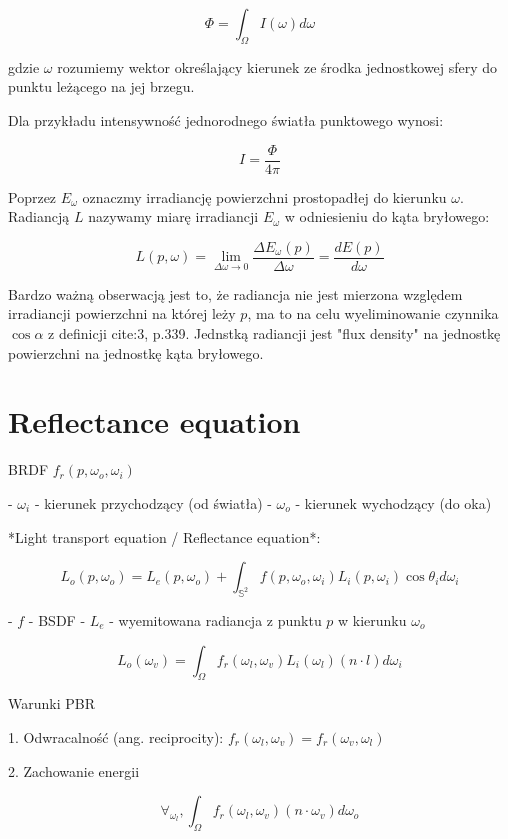 \documentclass[../main.tex]{subfiles}
\begin{document}
$$
\Phi = \int_{\Omega} {I(\omega) d\omega}
$$

gdzie $\omega$ rozumiemy wektor określający kierunek ze środka jednostkowej
sfery do punktu leżącego na jej brzegu.

Dla przykładu intensywność jednorodnego światła punktowego wynosi:

$$
I = \frac{\Phi}{4\pi}
$$

Poprzez $E_{\omega}$ oznaczmy irradiancję powierzchni prostopadłej do kierunku
$\omega$. Radiancją $L$ nazywamy miarę irradiancji $E_{\omega}$ w odniesieniu
do kąta bryłowego:

$$
L(p, \omega) = \lim_{\Delta\omega \rightarrow 0} {
  \frac{\Delta E_{\omega} (p)}{\Delta\omega}
} =
\frac{d E(p)}{d \omega}
$$

Bardzo ważną obserwacją jest to, że radiancja nie jest mierzona względem
irradiancji powierzchni na której leży $p$, ma to na celu wyeliminowanie
czynnika $\cos \alpha$ z definicji cite:3, p.339. Jednstką radiancji jest "flux
density" na jednostkę powierzchni na jednostkę kąta bryłowego.

\section{Reflectance equation}

BRDF $f_r(p, \omega_o, \omega_i)$

- $\omega_i$ - kierunek przychodzący (od światła)
- $\omega_o$ - kierunek wychodzący (do oka)

*Light transport equation / Reflectance equation*:

$$
L_o(p, \omega_o) =
  L_e(p, \omega_o) +
  \int_{\mathbb{S}^2} {
    f(p, \omega_o, \omega_i)
    L_i(p, \omega_i)
    \cos \theta_i
    d\omega_i
  }
$$

- $f$ - BSDF
- $L_e$ - wyemitowana radiancja z punktu $p$ w kierunku $\omega_o$

$$
L_o(\omega_v) = \int_{\Omega} {
    f_r(\omega_l, \omega_v)
    L_i(\omega_l)
    (n \cdot l)
    d \omega_i
}
$$

Warunki PBR

1. Odwracalność (ang. reciprocity):
	$f_r(\omega_l, \omega_v) = f_r(\omega_v, \omega_l)$

2. Zachowanie energii

$$
\forall_{\omega_l}, \int_{\Omega} {
    f_r(\omega_l, \omega_v)
    (n \cdot \omega_v) d\omega_o
}
$$
\end{document}
